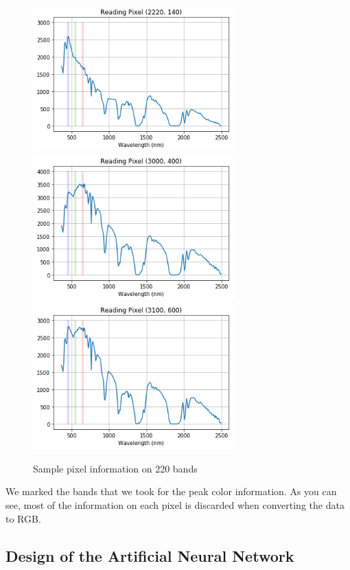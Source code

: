 \documentclass[letterpaper, 10 pt, conference]{ieeeconf}  %
\begin{document}
\begin{figure}[thpb]
      \centering
      \includegraphics[width=220pt]{BC_pixel_01.png}
      \includegraphics[width=220pt]{BC_pixel_02.png}
      \includegraphics[width=220pt]{BC_pixel_03.png}
      \caption{Sample pixel information on 220 bands}
      \label{figure_spectrum}
   \end{figure}

We marked the bands that we took for the peak color information. As you can see, most of the information on each pixel is discarded when converting the data to RGB.



\subsection{Design of the Artificial Neural Network}
\end{document}
